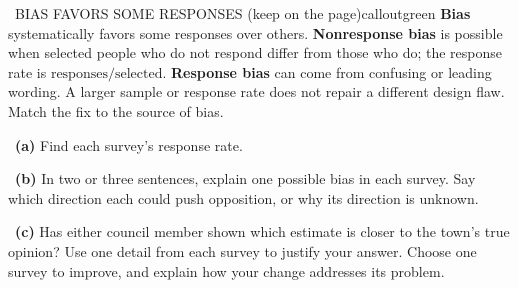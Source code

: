 \documentclass[11pt]{article}
\begin{document}
\begin{callout}{\IconBook\ BIAS FAVORS SOME RESPONSES (keep on the page)}{calloutgreen}
\textbf{Bias} systematically favors some responses over others. \textbf{Nonresponse bias} is possible when
selected people who do not respond differ from those who do; the response rate is
$\text{responses}/\text{selected}$. \textbf{Response bias} can come from confusing or leading wording.
A larger sample or response rate does not repair a different design flaw. Match the fix to the source of bias.
\end{callout}

~\textbf{(a)} Find each survey's response rate.\par
{}

~\textbf{(b)} In two or three sentences, explain one possible bias in each survey. Say which direction each could push opposition, or why its direction is unknown.\par
{}

~\textbf{(c)} Has either council member shown which estimate is closer to the town's true opinion? Use one detail from each survey to justify your answer. Choose one survey to improve, and explain how your change addresses its problem.\par
{}
\end{document}
